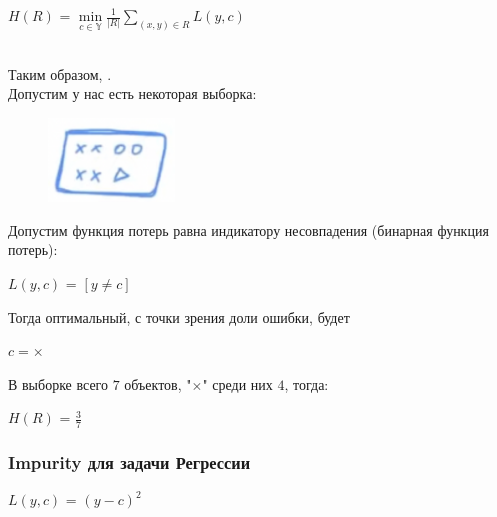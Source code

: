                 \begin{center}
                    \Large
                    $H(R)$ = $\min\limits_{c \in \mathbb{Y}}\frac{1}{|R|}\sum\limits_{(x, y) \in R}L(y, c)$
                \end{center}
                \\

                Таким образом, .\\

                Допустим у нас есть некоторая выборка:
                \begin{figure}[H]
                    \centering
                    \includegraphics[width=0.3\textwidth]{images/8lecture/ImpuritySample2.png}
                \end{figure}
                Допустим функция потерь равна индикатору несовпадения (бинарная функция потерь):
                \begin{center}
                    $L(y, c)$ = $[y \neq c]$
                \end{center}
                Тогда оптимальный, с точки зрения доли ошибки, будет
                \begin{center}
                     $c = \times$
                \end{center}

                В выборке всего $7$ объектов, "$\times$" среди них $4$, тогда:
                \begin{center}
                     $H(R)$ = $\frac{3}{7}$
                \end{center}


                \subsubsection{Impurity для задачи Регрессии}
                \begin{center}
                    $L(y, c)$ = $(y - c)^2$
                \end{center}

